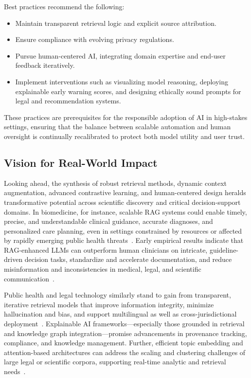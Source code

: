 \documentclass[sigconf]{acmart}
\begin{document}
Best practices recommend the following:
\begin{itemize}
    \item Maintain transparent retrieval logic and explicit source attribution.
    \item Ensure compliance with evolving privacy regulations.
    \item Pursue human-centered AI, integrating domain expertise and end-user feedback iteratively.
    \item Implement interventions such as visualizing model reasoning, deploying explainable early warning scores, and designing ethically sound prompts for legal and recommendation systems.
\end{itemize}
These practices are prerequisites for the responsible adoption of AI in high-stakes settings, ensuring that the balance between scalable automation and human oversight is continually recalibrated to protect both model utility and user trust.

\subsection{Vision for Real-World Impact}

Looking ahead, the synthesis of robust retrieval methods, dynamic context augmentation, advanced contrastive learning, and human-centered design heralds transformative potential across scientific discovery and critical decision-support domains. In biomedicine, for instance, scalable RAG systems could enable timely, precise, and understandable clinical guidance, accurate diagnoses, and personalized care planning, even in settings constrained by resources or affected by rapidly emerging public health threats~\cite{ref1, ref2, ref5, ref9, ref11}. Early empirical results indicate that RAG-enhanced LLMs can outperform human clinicians on intricate, guideline-driven decision tasks, standardize and accelerate documentation, and reduce misinformation and inconsistencies in medical, legal, and scientific communication~\cite{ref6, ref8, ref22, ref36, ref40}.

Public health and legal technology similarly stand to gain from transparent, iterative retrieval models that improve information integrity, minimize hallucination and bias, and support multilingual as well as cross-jurisdictional deployment~\cite{ref10, ref20, ref36, ref38}. Explainable AI frameworks—especially those grounded in retrieval and knowledge graph integration—promise advancements in provenance tracking, compliance, and knowledge management. Further, efficient topic embedding and attention-based architectures can address the scaling and clustering challenges of large legal or scientific corpora, supporting real-time analytic and retrieval needs~\cite{ref13, ref19, ref21}.
\end{document}
